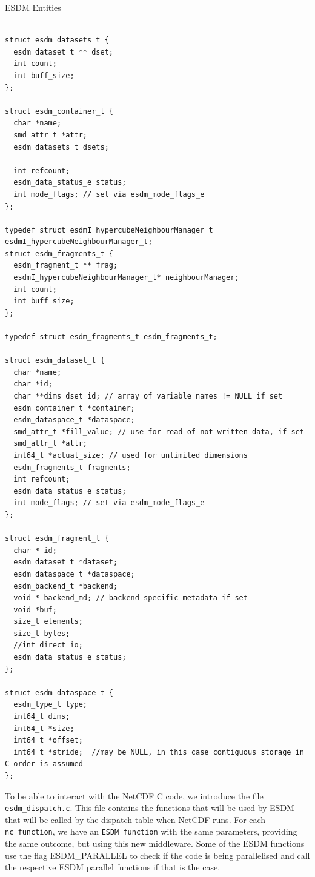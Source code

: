 \begin{tcbcode}[label=esdm-entitites]{ESDM Entities}
\begin{lstlisting}[upquote=true]

struct esdm_datasets_t {
  esdm_dataset_t ** dset;
  int count;
  int buff_size;
};

struct esdm_container_t {
  char *name;
  smd_attr_t *attr;
  esdm_datasets_t dsets;

  int refcount;
  esdm_data_status_e status;
  int mode_flags; // set via esdm_mode_flags_e
};

typedef struct esdmI_hypercubeNeighbourManager_t esdmI_hypercubeNeighbourManager_t;
struct esdm_fragments_t {
  esdm_fragment_t ** frag;
  esdmI_hypercubeNeighbourManager_t* neighbourManager;
  int count;
  int buff_size;
};

typedef struct esdm_fragments_t esdm_fragments_t;

struct esdm_dataset_t {
  char *name;
  char *id;
  char **dims_dset_id; // array of variable names != NULL if set
  esdm_container_t *container;
  esdm_dataspace_t *dataspace;
  smd_attr_t *fill_value; // use for read of not-written data, if set
  smd_attr_t *attr;
  int64_t *actual_size; // used for unlimited dimensions
  esdm_fragments_t fragments;
  int refcount;
  esdm_data_status_e status;
  int mode_flags; // set via esdm_mode_flags_e
};

struct esdm_fragment_t {
  char * id;
  esdm_dataset_t *dataset;
  esdm_dataspace_t *dataspace;
  esdm_backend_t *backend;
  void * backend_md; // backend-specific metadata if set
  void *buf;
  size_t elements;
  size_t bytes;
  //int direct_io;
  esdm_data_status_e status;
};

struct esdm_dataspace_t {
  esdm_type_t type;
  int64_t dims;
  int64_t *size;
  int64_t *offset;
  int64_t *stride;  //may be NULL, in this case contiguous storage in C order is assumed
};

\end{lstlisting}
\end{tcbcode}

To be able to interact with the NetCDF C code, we introduce the file \texttt{esdm\_dispatch.c}.
This file contains the functions that will be used by ESDM that will be called by the dispatch table when NetCDF runs.
For each \texttt{nc\_function}, we have an \texttt{ESDM\_function} with the same parameters, providing the same outcome, but using this new middleware.
Some of the ESDM functions use the flag ESDM\_PARALLEL to check if the code is being parallelised and call the respective ESDM parallel functions if that is the case.

